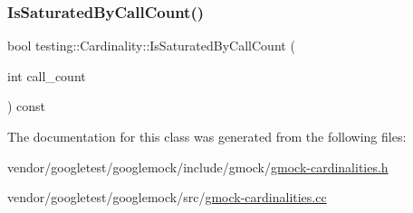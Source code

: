 \mbox{\label{classtesting_1_1_cardinality_a57128ba46931e24a2b39af177e3346f8}} 
\subsubsection{\texorpdfstring{Is\+Saturated\+By\+Call\+Count()}{IsSaturatedByCallCount()}}
{\footnotesize\ttfamily bool testing\+::\+Cardinality\+::\+Is\+Saturated\+By\+Call\+Count (\begin{DoxyParamCaption}\item[{int}]{call\+\_\+count }\end{DoxyParamCaption}) const\hspace{0.3cm}{\ttfamily [inline]}}



The documentation for this class was generated from the following files\+:\begin{DoxyCompactItemize}
\item 
vendor/googletest/googlemock/include/gmock/\hyperlink{gmock-cardinalities_8h}{gmock-\/cardinalities.\+h}\item 
vendor/googletest/googlemock/src/\hyperlink{gmock-cardinalities_8cc}{gmock-\/cardinalities.\+cc}\end{DoxyCompactItemize}
